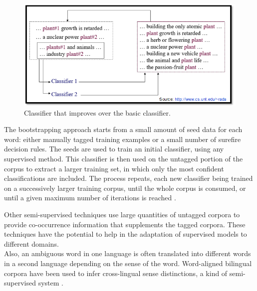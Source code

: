 \begin{figure}[tbh]
	\begin{center}
		\includegraphics[width=\columnwidth]{union(semi)}
	\end{center}
	\caption{Classifier that improves over the basic classifier. \label{fig3}}
\end{figure}

The bootstrapping approach starts from a small amount of seed data for each word: either manually tagged training examples or a small number of surefire decision rules. The seeds are used to train an initial classifier, using any supervised method. This classifier is then used on the untagged portion of the corpus to extract a larger training set, in which only the most confident classifications are included. The process repeats, each new classifier being trained on a successively larger training corpus, until the whole corpus is consumed, or until a given maximum number of iterations is reached \cite{Blascheck2016}.

Other semi-supervised techniques use large quantities of untagged corpora to provide co-occurrence information that supplements the tagged corpora. These techniques have the potential to help in the adaptation of supervised models to different domains.\\
Also, an ambiguous word in one language is often translated into different words in a second language depending on the sense of the word. Word-aligned bilingual corpora have been used to infer cross-lingual sense distinctions, a kind of semi-supervised system  \cite{Cheslow2014}.


